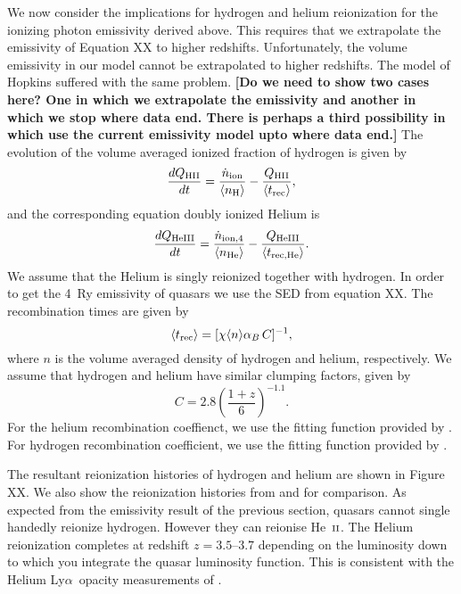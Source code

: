 \documentclass[a4paper,fleqn,usenatbib]{mnras}
\def\lya{Ly$\alpha$~}
\newcommand{\gk}[1]{{\bf \color{notecolor} [#1]}}
\def\nH{{\rm H}}
\def\nHII{{\rm HII}}
\def\nHe{{\rm He}}
\def\nHeIII{{\rm HeIII}}
\def\HeII{\hbox{He~$\scriptstyle\rm II$}}
\begin{document}
We now consider the implications for hydrogen and helium reionization
for the ionizing photon emissivity derived above.  This requires that
we extrapolate the emissivity of Equation XX to higher redshifts.
Unfortunately, the volume emissivity in our model cannot be
extrapolated to higher redshifts.  The model of Hopkins suffered with
the same problem.  \gk{Do we need to show two cases here?  One in
  which we extrapolate the emissivity and another in which we stop
  where data end.  There is perhaps a third possibility in which use
  the current emissivity model upto where data end.}  The evolution of
the volume averaged ionized fraction of hydrogen is given by
\citep{2012ApJ...746..125H}
\begin{equation}
{dQ_\nHII\over dt}={\dot n_{\rm ion}\over \langle n_\nH \rangle} -{Q_\nHII\over
\langle t_{\rm rec}\rangle},
\label{eq:qdot}
\end{equation}
and the corresponding equation doubly ionized Helium is
\begin{equation}
{dQ_\nHeIII\over dt}={\dot n_{\rm ion,4}\over \langle n_\nHe \rangle} -{Q_\nHeIII\over
\langle t_{\rm rec,He}\rangle}.
\label{eq:qHedot}
\end{equation}
We assume that the Helium is singly reionized together with hydrogen.
In order to get the 4~Ry emissivity of quasars we use the SED from
equation XX.  The recombination times are given by
\begin{equation}
\langle t_{\rm rec}\rangle=[\chi \langle n\rangle \alpha_B\,C]^{-1},
\label{eq:trec}
\end{equation}
where $n$ is the volume averaged density of hydrogen and helium,
respectively.  We assume that hydrogen and helium have similar
clumping factors, given by \citep{2015ApJ...813L...8M}
\begin{equation}
  C = 2.8\left(\frac{1+z}{6}\right)^{-1.1}.
\end{equation}
For the helium recombination coeffienct, we use the fitting function
provided by \citet{1997MNRAS.292...27H}.  For hydrogen recombination
coefficient, we use the fitting function provided by
\citet{2011piim.book.....D}.

The resultant reionization histories of hydrogen and helium are shown
in Figure XX.  We also show the reionization histories from
\citep{2012ApJ...746..125H} and \citep{2015ApJ...813L...8M} for
comparison.  As expected from the emissivity result of the previous
section, quasars cannot single handedly reionize hydrogen.  However
they can reionise \HeII.  The Helium reionization completes at
redshift $z=3.5$--$3.7$ depending on the luminosity down to which you
integrate the quasar luminosity function.  This is consistent with the
Helium \lya opacity measurements of \citet{2016ApJ...825..144W}.
\end{document}
